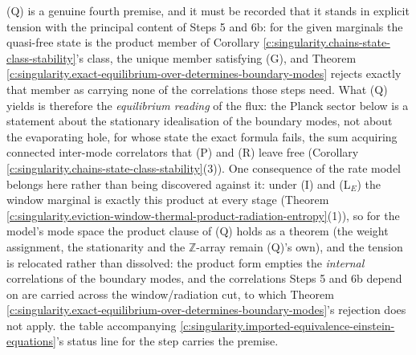 \documentclass[11pt]{article}
\theoremstyle{definition}
\theoremstyle{plain}
\begin{document}
\label{c:note.singularity.setting-step-4e-compute-completion-fermions-2}
(Q) is a genuine fourth premise, and it must be recorded that it stands in explicit tension with the principal content of Steps 5 and 6b: for the given marginals the quasi-free state is the product member of Corollary \ref{c:singularity.chains-state-class-stability}'s class, the unique member satisfying (G), and Theorem \ref{c:singularity.exact-equilibrium-over-determines-boundary-modes} rejects exactly that member as carrying none of the correlations those steps need. What (Q) yields is therefore the \emph{equilibrium reading} of the flux: the Planck sector below is a statement about the stationary idealisation of the boundary modes, not about the evaporating hole, for whose state the exact formula fails, the sum acquiring connected inter-mode correlators that (P) and (R) leave free (Corollary \ref{c:singularity.chains-state-class-stability}(3)). One consequence of the rate model belongs here rather than being discovered against it: under (I) and (L$_E$) the window marginal is exactly this product at every stage (Theorem \ref{c:singularity.eviction-window-thermal-product-radiation-entropy}(1)), so for the model's mode space the product clause of (Q) holds as a theorem (the weight assignment, the stationarity and the $\mathbb{Z}$-array remain (Q)'s own), and the tension is relocated rather than dissolved: the product form empties the \emph{internal} correlations of the boundary modes, and the correlations Steps 5 and 6b depend on are carried across the window/radiation cut, to which Theorem \ref{c:singularity.exact-equilibrium-over-determines-boundary-modes}'s rejection does not apply. the table accompanying \ref{c:singularity.imported-equivalence-einstein-equations}'s status line for the step carries the premise.
\end{document}
